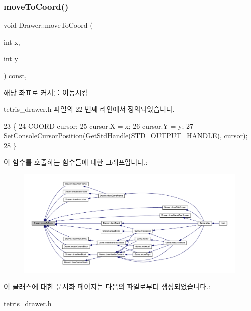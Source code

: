 \subsubsection{\texorpdfstring{move\+To\+Coord()}{moveToCoord()}}
{\footnotesize\ttfamily void Drawer\+::move\+To\+Coord (\begin{DoxyParamCaption}\item[{int}]{x,  }\item[{int}]{y }\end{DoxyParamCaption}) const\hspace{0.3cm}{\ttfamily [inline]}, {\ttfamily [private]}}



해당 좌표로 커서를 이동시킴 



tetris\+\_\+drawer.\+h 파일의 22 번째 라인에서 정의되었습니다.


\begin{DoxyCode}
23     \{
24         COORD cursor;
25         cursor.X = x;
26         cursor.Y = y;
27         SetConsoleCursorPosition(GetStdHandle(STD\_OUTPUT\_HANDLE), cursor);
28     \}
\end{DoxyCode}
이 함수를 호출하는 함수들에 대한 그래프입니다.\+:
\nopagebreak
\begin{figure}[H]
\begin{center}
\leavevmode
\includegraphics[width=350pt]{class_drawer_ac1a96e007c07cab2e36a7c78484ee9a6_icgraph}
\end{center}
\end{figure}


이 클래스에 대한 문서화 페이지는 다음의 파일로부터 생성되었습니다.\+:\begin{DoxyCompactItemize}
\item 
\mbox{\hyperlink{tetris__drawer_8h}{tetris\+\_\+drawer.\+h}}\end{DoxyCompactItemize}
